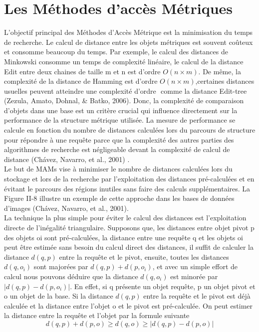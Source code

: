 \section{Les Méthodes d’accès Métriques}
L'objectif principal des Méthodes d’Accès Métrique est la minimisation du temps de recherche. Le calcul de distance entre les objets métriques est souvent coûteux et consomme beaucoup du temps. Par exemple, le calcul des distances de Minkowski consomme un temps de complexité linéaire, le calcul de la distance Edit entre deux chaines de taille m et n est d’ordre $ O(n\times m) $. De même, la complexité de la distance de Hamming est d’ordre $ O(n\times m) $,certaines distances usuelles peuvent atteindre une complexité d’ordre $   $ comme la distance Edit-tree (Zezula, Amato, Dohnal, \& Batko, 2006). Donc, la complexité de comparaison d’objets dans une base est un critère crucial qui influence directement sur la performance de la structure métrique utilisée. La mesure de performance se calcule en fonction du nombre de distances calculées lors du parcours de structure pour répondre à une requête parce que la complexité des autres parties des algorithmes de recherche est négligeable devant la complexité de calcul de distance (Chávez, Navarro, et al., 2001) .\\

Le but de MAMs vise à minimiser le nombre de distances calculées lors du stockage et lors de la recherche par l’exploitation des distances pré-calculées et en évitant le parcours des régions inutiles sans faire des calculs supplémentaires. La Figure II-8 illustre un exemple de cette approche dans les bases de données d’images (Chávez, Navarro, et al., 2001).\\


La technique la plus simple pour éviter le calcul des distances est l’exploitation directe de l’inégalité triangulaire. Supposons que, les distances entre objet pivot p des objets oi sont pré-calculées, la distance entre une requête q et les objets oi peut être estimée sans besoin du calcul direct des distances, il suffit de calculer la distance $ d(q,p) $ entre la requête et le pivot, ensuite, toutes les distances $ d(q,o_i) $ sont majorées par $ d(q,p)+d(p,o_i) $, et avec un simple effort de calcul nous pouvons déduire que la distance $ d(q,o_i) $ est minorée par $ |d(q,p)-d(p,o_i)| $. En effet, si q présente un objet requête, p un objet pivot et o un objet de la base. Si la distance $ d(q,p) $ entre la requête et le pivot est déjà calculée et la distance entre l’objet o et le pivot est pré-calculée. On peut estimer la distance entre la requête et l’objet par la formule suivante 
\begin{equation}
    d(q,p)+d(p,o) \geq d(q,o) \geq |d(q,p)-d(p,o)|
\end{equation}

